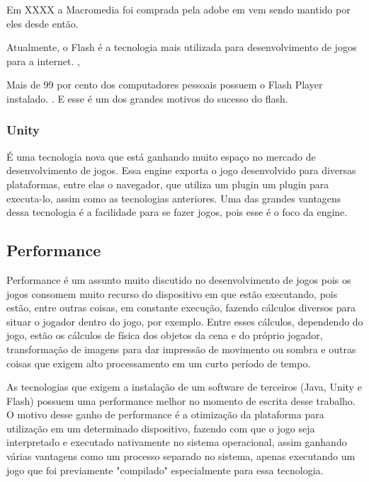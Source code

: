 Em XXXX a Macromedia foi comprada pela adobe em vem sendo mantido por
eles desde então.

Atualmente, o Flash é a tecnologia mais utilizada para desenvolvimento de jogos para a
internet. \cite{adobeflashleading},

Mais de 99 por cento dos computadores pessoais possuem o Flash Player
instalado. \cite{adobeflashpenetration}. E esse é um dos grandes
motivos do sucesso do flash.


\subsubsection{Unity}

É uma tecnologia nova que está ganhando muito espaço no mercado de
desenvolvimento de jogos. Essa engine exporta o jogo desenvolvido para
diversas plataformas, entre elas o navegador, que utiliza um plugin um
plugin para executa-lo, assim como as tecnologias anteriores.
Uma das grandes vantagens dessa tecnologia é a facilidade para se
fazer jogos, pois esse é o foco da engine.


\subsection{Performance}

Performance é um assunto muito discutido no desenvolvimento de jogos
pois os jogos consomem muito recurso do dispositivo em que estão
executando, pois estão, entre outras coisas, em constante execução, fazendo
cálculos diversos para situar o jogador dentro do jogo, por exemplo.
Entre esses cálculos, dependendo do jogo, estão os cálculos de física dos
objetos da cena e do próprio jogador, transformação de imagens para
dar impressão de movimento ou sombra e outras coisas que exigem alto
processamento em um curto período de tempo.

As tecnologias que exigem a instalação de um software de terceiros
(Java, Unity e Flash) possuem uma performance melhor no
momento de escrita desse trabalho. O motivo desse ganho de performance
é a otimização da plataforma para utilização em um determinado
dispositivo, fazendo com que o jogo seja interpretado e executado
nativamente no sistema operacional, assim ganhando várias
vantagens como um processo separado no sistema, apenas executando um
jogo que foi previamente "compilado" especialmente para essa tecnologia.

